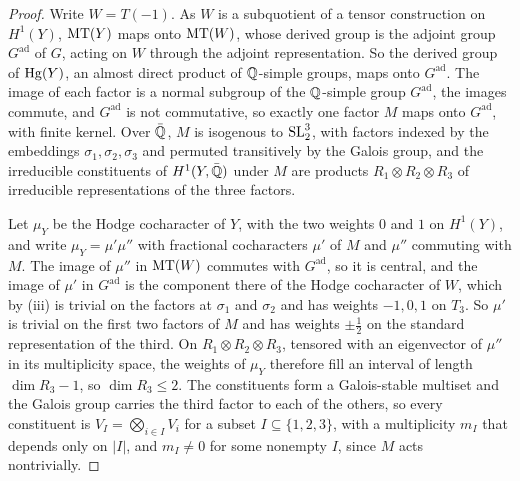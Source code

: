 \begin{proof}
Write $W=T(-1)$. As $W$ is a subquotient of a tensor construction on
$H^{1}(Y)$, $\operatorname{MT}(Y)$ maps onto $\operatorname{MT}(W)$, whose derived group is the adjoint
group $G^{\mathrm{ad}}$ of $G$, acting on $W$ through the adjoint
representation. So the derived group of $\operatorname{Hg}(Y)$, an almost direct product of
$\mathbb{Q}$-simple groups, maps onto $G^{\mathrm{ad}}$. The image of each factor is
a normal subgroup of the $\mathbb{Q}$-simple group $G^{\mathrm{ad}}$, the images
commute, and $G^{\mathrm{ad}}$ is not commutative, so exactly one factor $M$
maps onto $G^{\mathrm{ad}}$, with finite kernel. Over $\bar{\mathbb{Q}}$, $M$ is
isogenous to $\operatorname{SL}_{2}^{3}$, with factors indexed by the embeddings
$\sigma_{1},\sigma_{2},\sigma_{3}$ and permuted transitively by the Galois
group, and the irreducible constituents of $H^{1}(Y,\bar{\mathbb{Q}})$ under $M$ are
products $R_{1}\otimes R_{2}\otimes R_{3}$ of irreducible representations of
the three factors.

Let $\mu_{Y}$ be the Hodge cocharacter of $Y$, with the two weights $0$ and
$1$ on $H^{1}(Y)$, and write $\mu_{Y}=\mu'\mu''$ with fractional cocharacters
$\mu'$ of $M$ and $\mu''$ commuting with $M$. The image of $\mu''$ in
$\operatorname{MT}(W)$ commutes with $G^{\mathrm{ad}}$, so it is central, and the image of
$\mu'$ in $G^{\mathrm{ad}}$ is the component there of the Hodge cocharacter of
$W$, which by (iii) is trivial on the factors at
$\sigma_{1}$ and $\sigma_{2}$ and has weights $-1,0,1$ on $T_{3}$. So $\mu'$
is trivial on the first two factors of $M$ and has weights $\pm\frac12$ on
the standard representation of the third. On
$R_{1}\otimes R_{2}\otimes R_{3}$, tensored with an eigenvector of $\mu''$
in its multiplicity space, the weights of $\mu_{Y}$ therefore fill an
interval of length $\dim R_{3}-1$, so
$\dim R_{3}\le2$. The constituents form a Galois-stable multiset and the
Galois group carries the third factor to each of the others, so every
constituent is $V_{I}=\bigotimes_{i\in I}V_{i}$ for a subset
$I\subseteq\{1,2,3\}$, with a multiplicity $m_{I}$ that depends only on $|I|$,
and $m_{I}\ne0$ for some nonempty $I$, since $M$ acts nontrivially.


\end{proof}
